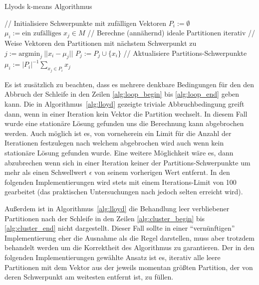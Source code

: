 \documentclass[
    bibliography=totoc, cd=lightcolor, cdmath=false, ngerman]{tudscrreprt}
\begin{document}
\begin{algorithm}
    \caption{Llyods k-means Algorithmus}
    \begin{algorithmic}[1]
            \State // Initialisiere Schwerpunkte mit zufälligen Vektoren
                \State $P_i := \emptyset$
                \State $\mu_i := \text{ein zufälliges } x_j \in M$
            \EndFor
            \State // Berechne (annähernd) ideale Partitionen iterativ
             \label{alg:loop_begin}
                \State // Weise Vektoren den Partitionen mit nächstem Schwerpunkt zu
                 \label{alg:cluster_begin}
                    \State $j := \mathrm{argmin}_j\ ||x_i - \mu_j||$
                    \State $P_j := P_j \cup \{x_i\}$
                \EndFor \label{alg:cluster_end}
                \State // Aktualisiere Partitions-Schwerpunkte
                    \State $\mu_i := |P_i|^{-1} \sum_{x_j \in P_i} x_j$
                \EndFor
            \EndWhile \label{alg:loop_end}
        \EndProcedure
    \end{algorithmic}
    \label{alg:lloyd}
\end{algorithm}

Es ist zusätzlich zu beachten, dass es mehrere denkbare Bedingungen für den den
Abbruch der Schleife in den Zeilen \ref{alg:loop_begin} bis \ref{alg:loop_end}
geben kann. Die in Algorithmus~\ref{alg:lloyd} gezeigte triviale
Abbruchbedingung greift dann, wenn in einer Iteration kein Vektor die Partition
wechselt. In diesem Fall wurde eine stationäre Lösung gefunden uns die
Berechnung kann abgebrochen werden. Auch möglich ist es, von vorneherein ein
Limit für die Anzahl der Iterationen festzulegen nach welchem abgebrochen wird
auch wenn kein stationäre Lösung gefunden wurde. Eine weitere Möglichkeit wäre
es, dann abzubrechen wenn sich in einer Iteration keiner der
Partitions-Schwerpunkte um mehr als einen Schwellwert $\epsilon$ von seinem
vorherigen Wert entfernt. In den folgenden Implementierungen wird stets mit
einem Iterations-Limit von 100 gearbeitet (das praktischen Untersuchungen nach
jedoch selten erreicht wird).

Außerdem ist in Algorithmus~\ref{alg:lloyd} die Behandlung leer verbliebener
Partitionen nach der Schleife in den Zeilen \ref{alg:cluster_begin} bis
\ref{alg:cluster_end} nicht dargestellt. Dieser Fall sollte in einer
``vernünftigen'' Implementierung eher die Ausnahme als die Regel darstellen,
muss aber trotzdem behandelt werden um die Korrektheit des Algorithmus zu
garantieren. Der in den folgenden Implementierungen gewählte Ansatz ist es,
iterativ alle leere Partitionen mit dem Vektor aus der jeweils momentan größten
Partition, der von deren Schwerpunkt am weitesten entfernt ist, zu füllen.
\end{document}
